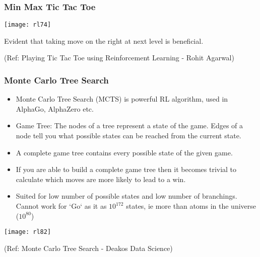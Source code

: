 \begin{frame}[fragile]\frametitle{Min Max Tic Tac Toe}



\begin{center}
\texttt{[image: rl74]}
\end{center}

Evident that taking move on the right at next level is beneficial.

{\tiny (Ref: Playing Tic Tac Toe using Reinforcement Learning - Rohit Agarwal)}

\end{frame}

\begin{frame}[fragile]\frametitle{Monte Carlo Tree Search}

\begin{itemize}
\item Monte Carlo Tree Search (MCTS) is powerful RL algorithm, used in AlphaGo, AlphaZero etc.
\item Game Tree: The nodes of a tree represent a state of the game. Edges of a node tell you what possible states can be reached from the current state.
\item A complete game tree contains every possible state of the given game. 
\item If you are able to build a complete game tree then it becomes trivial to calculate which moves are more likely to lead to a win.
\item Suited for low number of possible states and low number of branchings. Cannot work for `Go` as it as $10^{172}$ states, ie more than atoms in the universe ($10^{80}$)
\end{itemize}


\begin{center}
\texttt{[image: rl82]}
\end{center}


{\tiny (Ref: Monte Carlo Tree Search - Deakos Data Science)}

\end{frame}

